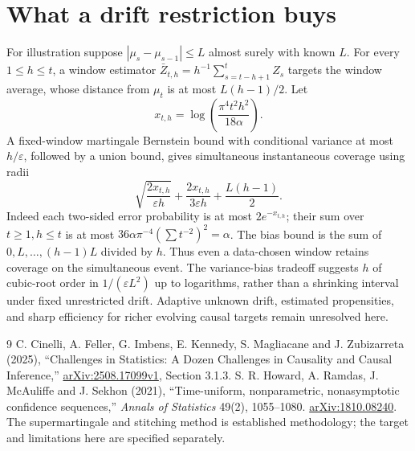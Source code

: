 \documentclass[11pt,a4paper]{article}
\theoremstyle{remark}
\begin{document}
\section{What a drift restriction buys}
For illustration suppose $|\mu_s-\mu_{s-1}|\le L$ almost surely with known $L$. For every $1\le h\le t$, a window estimator $\bar Z_{t,h}=h^{-1}\sum_{s=t-h+1}^t Z_s$ targets the window average, whose distance from $\mu_t$ is at most $L(h-1)/2$. Let
\[
 x_{t,h}=\log\left(\frac{\pi^4t^2h^2}{18\alpha}\right).
\]
A fixed-window martingale Bernstein bound with conditional variance at most $h/\varepsilon$, followed by a union bound, gives simultaneous instantaneous coverage using radii
\[
 \sqrt{\frac{2x_{t,h}}{\varepsilon h}}+
 \frac{2x_{t,h}}{3\varepsilon h}+\frac{L(h-1)}2.
\]
Indeed each two-sided error probability is at most $2e^{-x_{t,h}}$; their sum over $t\ge1,h\le t$ is at most $36\alpha\pi^{-4}(\sum t^{-2})^2=\alpha$. The bias bound is the sum of $0,L,\ldots,(h-1)L$ divided by $h$. Thus even a data-chosen window retains coverage on the simultaneous event. The variance-bias tradeoff suggests $h$ of cubic-root order in $1/(\varepsilon L^2)$ up to logarithms, rather than a shrinking interval under fixed unrestricted drift. Adaptive unknown drift, estimated propensities, and sharp efficiency for richer evolving causal targets remain unresolved here.

\begin{thebibliography}{9}
 C. Cinelli, A. Feller, G. Imbens, E. Kennedy, S. Magliacane and J. Zubizarreta (2025), ``Challenges in Statistics: A Dozen Challenges in Causality and Causal Inference,'' \href{https://arxiv.org/abs/2508.17099v1}{arXiv:2508.17099v1}, Section 3.1.3.
 S. R. Howard, A. Ramdas, J. McAuliffe and J. Sekhon (2021), ``Time-uniform, nonparametric, nonasymptotic confidence sequences,'' \emph{Annals of Statistics} 49(2), 1055--1080. \href{https://arxiv.org/abs/1810.08240}{arXiv:1810.08240}. The supermartingale and stitching method is established methodology; the target and limitations here are specified separately.
\end{thebibliography}
\end{document}
